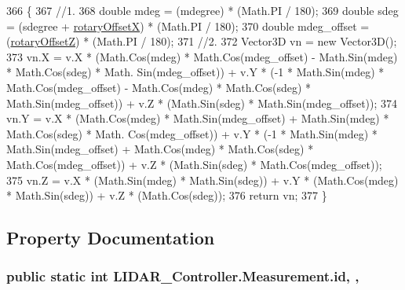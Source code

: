 \begin{DoxyCode}
366         \{
367             \textcolor{comment}{//1.}
368             \textcolor{keywordtype}{double} mdeg = (mdegree) * (Math.PI / 180); 
369             \textcolor{keywordtype}{double} sdeg = (sdegree + \hyperlink{class_l_i_d_a_r___controller_1_1_measurement_a26ac087dbaf4f45ee4550cf5668ae4ff}{rotaryOffsetX}) * (Math.PI / 180); 
370             \textcolor{keywordtype}{double} mdeg\_offset = (\hyperlink{class_l_i_d_a_r___controller_1_1_measurement_aeb96de05257dd310531350f3af1eb47e}{rotaryOffsetZ}) * (Math.PI / 180); 
371             \textcolor{comment}{//2.}
372             Vector3D vn = \textcolor{keyword}{new} Vector3D();
373             vn.X = v.X * (Math.Cos(mdeg) * Math.Cos(mdeg\_offset) - Math.Sin(mdeg) * Math.Cos(sdeg) * Math.
      Sin(mdeg\_offset)) + v.Y * (-1 * Math.Sin(mdeg) * Math.Cos(mdeg\_offset) - Math.Cos(mdeg) * Math.Cos(sdeg) * 
      Math.Sin(mdeg\_offset)) + v.Z * (Math.Sin(sdeg) * Math.Sin(mdeg\_offset));
374             vn.Y = v.X * (Math.Cos(mdeg) * Math.Sin(mdeg\_offset) + Math.Sin(mdeg) * Math.Cos(sdeg) * Math.
      Cos(mdeg\_offset)) + v.Y * (-1 * Math.Sin(mdeg) * Math.Sin(mdeg\_offset) + Math.Cos(mdeg) * Math.Cos(sdeg) * 
      Math.Cos(mdeg\_offset)) + v.Z * (Math.Sin(sdeg) * Math.Cos(mdeg\_offset));
375             vn.Z = v.X * (Math.Sin(mdeg) * Math.Sin(sdeg)) + v.Y * (Math.Cos(mdeg) * Math.Sin(sdeg)) + v.Z 
      * (Math.Cos(sdeg));
376             \textcolor{keywordflow}{return} vn;
377         \}
\end{DoxyCode}


\subsection{Property Documentation}
\subsubsection[{\texorpdfstring{id}{id}}]{\setlength{\rightskip}{0pt plus 5cm}public static int L\+I\+D\+A\+R\+\_\+\+Controller.\+Measurement.\+id\hspace{0.3cm}{\ttfamily [static]}, {\ttfamily [get]}, {\ttfamily [set]}}\hypertarget{class_l_i_d_a_r___controller_1_1_measurement_a1aa9b624e651ef61b95f13fe5cb8f326}{}\label{class_l_i_d_a_r___controller_1_1_measurement_a1aa9b624e651ef61b95f13fe5cb8f326}


